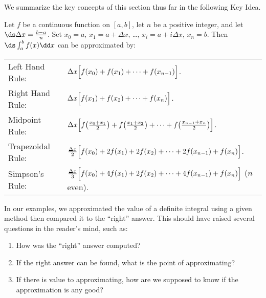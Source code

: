 We summarize the key concepts of this section thus far in the following Key Idea.

{
\begin{keyidea}\label{idea:numerical}%
Let $f$ be a continuous function on $[a,b]$, let $n$ be a positive integer, and let $\ds\Delta x = \frac{b-a}{n}$.
Set $x_0=a$, $x_1=a+\Delta x$, \dots, $x_i = a+i\Delta x$, $x_n=b$.
Then $\ds\int_a^b f(x)\dd x$ can be approximated by:\\
%
%
%
%
%
%
%
%
%
%
%
%
\begin{tabular}{ll}
Left Hand Rule: &
$\Delta x\Bigl[f(x_0) + f(x_1) + \dotsb + f(x_{n-1})\Bigr]$.\\\addlinespace
Right Hand Rule: &
$\Delta x\Bigl[f(x_1) + f(x_2) + \dotsb + f(x_n)\Bigr]$.\\\addlinespace
Midpoint Rule: &
$\Delta x\Bigl[f\bigl(\frac{x_0+x_1}2\bigr) + f\bigl(\frac{x_1+x_2}2\bigr) + \dotsb + f\bigl(\frac{x_{n-1}+x_n}2\bigr)\Bigr]$.\\\addlinespace
Trapezoidal Rule: &
$\frac{\Delta x}2\Bigl[f(x_0) + 2f(x_1) + 2f(x_2) +\dotsb + 2f(x_{n-1})+ f(x_n)\Bigr]$.\\\addlinespace
Simpson's Rule: &
$\frac{\Delta x}3\Bigl[f(x_0) + 4f(x_1) + 2f(x_2) +\dotsb + 4f(x_{n-1})+ f(x_n)\Bigr]$ {\small ($n$ even)}.
\end{tabular}
\end{keyidea}
}

In our examples, we approximated the value of a definite integral using a given method then compared it to the ``right'' answer. This should have raised several questions in the reader's mind, such as:
\begin{enumerate}
	\item	How was the ``right'' answer computed?
	\item	If the right answer can be found, what is the point of approximating?
	\item	If there is value to approximating, how are we supposed to know if the approximation is any good?
\end{enumerate}

